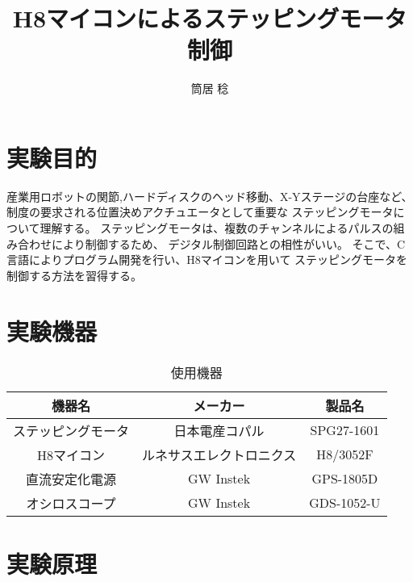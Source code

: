 \documentclass[10pt,a4paper]{jarticle}
\begin{document}
\title{H8マイコンによるステッピングモータ制御}
\author{筒居 稔}
\maketitle
\section{実験目的}
産業用ロボットの関節,ハードディスクのヘッド移動、X-Yステージの台座など、
制度の要求される位置決めアクチュエータとして重要な
ステッピングモータについて理解する。
ステッピングモータは、複数のチャンネルによるパルスの組み合わせにより制御するため、
デジタル制御回路との相性がいい。
そこで、C言語によりプログラム開発を行い、H8マイコンを用いて
ステッピングモータを制御する方法を習得する。
\section{実験機器}
\begin{table}[hbtp]
 \caption{使用機器}
 \label{siyou}
 \centering
  \begin{tabular}{|c|c|c|}\hline
  機器名&メーカー&製品名\\ \hline
  ステッピングモータ&日本電産コパル&SPG27-1601\\ \hline
  H8マイコン&ルネサスエレクトロニクス&H8/3052F\\ \hline
  直流安定化電源&GW Instek&GPS-1805D\\ \hline
  オシロスコープ&GW Instek&GDS-1052-U\\ \hline
  \end{tabular}
\end{table}
\section{実験原理}
\end{document}
